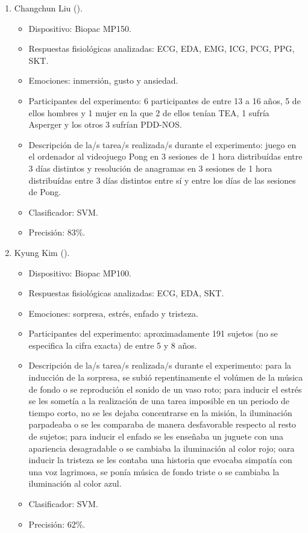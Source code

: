 \begin{enumerate}
    \item Changchun Liu (\citeyear{liu2008physiology}).
    \begin{itemize}
        \item Dispositivo: Biopac MP150.
        \item Respuestas fisiológicas analizadas: \ac{ECG}, \ac{EDA}, \ac{EMG}, \ac{ICG}, \ac{PCG}, \ac{PPG}, \ac{SKT}. 
        \item Emociones: inmersión, gusto y ansiedad.
        \item Participantes del experimento: 6 participantes de entre 13 a 16 años, 5 de ellos hombres y 1 mujer en la que 2 de ellos tenían TEA, 1 sufría Asperger y los otros 3 sufrían \ac{PDD-NOS}.
        \item Descripción de la/s tarea/s realizada/s durante el experimento: juego en el ordenador al videojuego Pong\citep{lowood2009videogames} en 3 sesiones de 1 hora distribuídas entre 3 días distintos y resolución de anagramas en 3 sesiones de 1 hora distribuídas entre 3 días distintos entre sí y entre los días de las sesiones de Pong.
        \item Clasificador: \ac{SVM}.
        \item Precisión: 83\%.
    \end{itemize}

    \item Kyung Kim (\citeyear{kim2004emotion}).
    \begin{itemize}
        \item Dispositivo: Biopac MP100.
        \item Respuestas fisiológicas analizadas: ECG, EDA, SKT.
        \item Emociones: sorpresa, estrés, enfado y tristeza.
        \item Participantes del experimento: aproximadamente 191 sujetos (no se especifica la cifra exacta) de entre 5 y 8 años.
        \item Descripción de la/s tarea/s realizada/s durante el experimento: para la inducción de la sorpresa, se subió repentinamente el volúmen de la música de fondo o se reprodución el sonido de un vaso roto; para inducir el estrés se les sometía a la realización de una tarea imposible en un periodo de tiempo corto, no se les dejaba concentrarse en la misión, la iluminación parpadeaba o se les comparaba de manera desfavorable respecto al resto de sujetos; para inducir el enfado se les enseñaba un juguete con una apariencia desagradable o se cambiaba la iluminación al color rojo; oara inducir la tristeza se les contaba una historia que evocaba simpatía con una voz lagrimosa, se ponía música de fondo triste o se cambiaba la iluminación al color azul.
        \item Clasificador: SVM.
        \item Precisión: 62\%.
    \end{itemize}


\end{enumerate}
